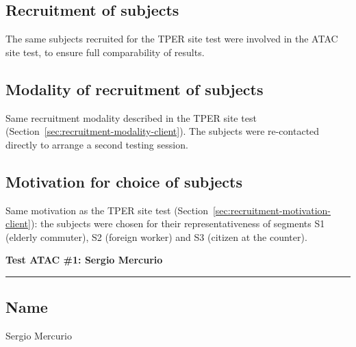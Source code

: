 ﻿\documentclass[11pt,a4paper]{article}
\begin{document}
\vspace{0.2cm}

\subsection*{Recruitment of subjects}
\begin{tcolorbox}[base]
The same subjects recruited for the TPER site test
were involved in the ATAC site test, to ensure
full comparability of results.
\end{tcolorbox}

\vspace{0.2cm}

\subsection*{Modality of recruitment of subjects}
\begin{tcolorbox}[base]
Same recruitment modality described in the TPER site test
(Section~\ref{sec:recruitment-modality-client}). The subjects were
re-contacted directly to arrange a second testing
session.
\end{tcolorbox}

\vspace{0.2cm}

\subsection*{Motivation for choice of subjects}
\begin{tcolorbox}[base]
Same motivation as the TPER site test
(Section~\ref{sec:recruitment-motivation-client}): the subjects
were chosen for their representativeness of segments
S1 (elderly commuter), S2 (foreign worker) and S3
(citizen at the counter).
\end{tcolorbox}


\newpage
\begin{center}
  {\color{secondaryColor}\large\bfseries
  Test ATAC \#1: Sergio Mercurio}\\
  \vspace{0.1cm}
  \color{borderColor}\hrule
\end{center}

\vspace{0.5cm}

\subsection*{Name}
\begin{tcolorbox}[base]
Sergio Mercurio
\end{tcolorbox}
\end{document}
